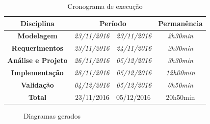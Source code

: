 \documentclass [12pt]{article}
\begin{document}
	\begin{table}[ht]
		\centering
		\caption{Cronograma de execução}
		\label{tab:crono}
		\begin{tabular}{c|r@{-}l|c} \hline
			\rowcolor[HTML]{656565}
			\textbf{Disciplina}                    & \multicolumn{2}{c|}{\cellcolor[HTML]{656565}\textbf{Período}} & \textbf{Permanência} \\ \hline
			\textbf{Modelagem}                     & \textit{23/11/2016}           & \textit{23/11/2016}           & \textit{2h30min}     \\ \hline
			\textbf{Requerimentos}                 & \textit{23/11/2016}           & \textit{24/11/2016}           & \textit{2h30min}     \\ \hline
			\textbf{Análise e Projeto}             & \textit{26/11/2016}           & \textit{05/12/2016}           & \textit{3h30min}     \\ \hline
			\textbf{Implementação}                 & \textit{28/11/2016}           & \textit{05/12/2016}          & \textit{12h00min}    \\ \hline
			\textbf{Validação}                     & \textit{04/12/2016}           & \textit{05/12/2016}           & \textit{0h50min}     \\ \hline
			\rowcolor[HTML]{C0C0C0} 
			\cellcolor[HTML]{656565}\textbf{Total} & 23/11/2016                    & 05/12/2016                    & 20h50min   \\ \hline         
		\end{tabular}
	\end{table}

	\begin{figure}[h]
		\centering
		\goodgap
		\caption{Diagramas gerados}
		\label{fig:Diagramas}
	\end{figure}
	
\end{document}
